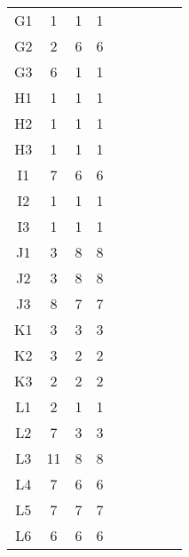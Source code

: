 \begin{center}
\begin{longtable}{ccccc|cccc}
G1    & 1     & 1     & 1 \\
G2    & 2     & 6     & 6 \\
G3    & 6     & 1     & 1 \\
H1    & 1     & 1     & 1 \\
H2    & 1     & 1     & 1 \\
H3    & 1     & 1     & 1 \\
I1    & 7     & 6     & 6 \\
I2    & 1     & 1     & 1 \\
I3    & 1     & 1     & 1 \\
J1    & 3     & 8     & 8 \\
J2    & 3     & 8     & 8 \\
J3    & 8     & 7     & 7 \\
K1    & 3     & 3     & 3 \\
K2    & 3     & 2     & 2 \\
K3    & 2     & 2     & 2 \\
L1    & 2     & 1     & 1 \\
L2    & 7     & 3     & 3 \\
L3    & 11    & 8     & 8 \\
L4    & 7     & 6     & 6 \\
L5    & 7     & 7     & 7 \\
L6    & 6     & 6     & 6 \\
\end{longtable}
\end{center}

